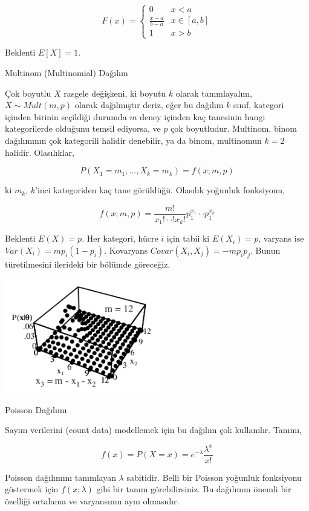 \documentclass[12pt,fleqn]{article}\usepackage{../../common}
\begin{document}
$$ F(x) = 
\left\{ \begin{array}{ll}
0 & x < a \\
\frac{ x-a}{b-a} & x \in [a,b] \\
1 & x > b
\end{array} \right.
 $$

Beklenti $E[X] = 1$. 

Multinom (Multinomial) Dağılım 

Çok boyutlu $X$ rasgele değişkeni, ki boyutu $k$ olarak tanımlayalım, 
$X \sim Mult(m,p)$ olarak dağılmıştır deriz, eğer bu dağılım $k$ sınıf, kategori
içinden birinin seçildiği durumda $m$ deney içinden kaç tanesinin hangi
kategorilerde olduğunu temsil ediyorsa, ve $p$ çok boyutludur. Multinom, 
binom dağılımının çok kategorili halidir denebilir, ya da binom, 
multinomun $k=2$ halidir. Olasılıklar,

$$ P(X_1=m_1,...,X_k=m_k) = f(x;m,p) $$

ki $m_k$, $k$'inci kategoriden kaç tane görüldüğü. Olasılık yoğunluk
fonksiyonu,

$$ f(x;m,p) = \frac{m!}{x_1! \cdot \cdot !x_k!} p_{1}^{x_1} \cdot \cdot  p_{1}^{x_k} $$

Beklenti $ E(X) = p $. Her kategori, hücre $i$ için tabii ki $ E(X_i) = p$, 
varyans ise $Var(X_i) = m p_i(1-p_i)$. Kovaryans $Covar(X_i,X_j) =
-mp_ip_j$. 
Bunun türetilmesini ilerideki bir bölümde göreceğiz. 

\includegraphics[height=5cm]{multinom.png}

Poisson Dağılımı

Sayım verilerini (count data) modellemek için bu dağılım çok
kullanılır. Tanımı, 

$$ f(x) = P(X=x) = e^{-\lambda}\frac{\lambda^{x}}{x!} $$

Poisson dağılımını tanımlayan $\lambda$ sabitidir. Belli bir Poisson
yoğunluk fonksiyonu göstermek için $f(x;\lambda)$ gibi bir tanım
görebilirsiniz. Bu dağılımın önemli bir özelliği ortalama ve varyansının
aynı olmasıdır. 
\end{document}
